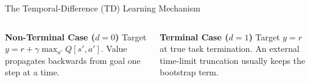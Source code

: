 \documentclass[aspectratio=169,10pt]{beamer}
\begin{document}
\begin{frame}{The Temporal-Difference (TD) Learning Mechanism}
  \vspace{0.14cm}
  \begin{columns}[T,onlytextwidth]
      \begin{block}{\small\color{islteal}\textbf{Non-Terminal Case ($d=0$)}}
        \footnotesize Target $y = r + \gamma \max_{a'} Q[s', a']$. Value propagates backwards from goal one step at a time.
      \end{block}
      \begin{block}{\small\color{islred}\textbf{Terminal Case ($d=1$)}}
        \footnotesize Target $y = r$ at true task termination. An external time-limit truncation usually keeps the bootstrap term.
      \end{block}
  \end{columns}
\end{frame}
\end{document}
